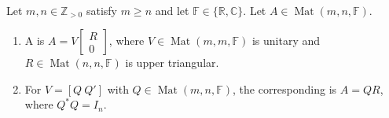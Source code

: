 \begin{definition} \label{def:wide-and-narrow-qr-factorization} \\
Let $m,n\in\mathbb{Z}_{>0}$ satisfy $m\geq n$ and let $\mathbb{F}\in\{\mathbb{R},\mathbb{C}\}$. Let $A\in\operatorname{Mat}(m,n,\mathbb{F})$.
\begin{enumerate}[label=(\roman*)]
\setlength{\itemsep}{0pt}
\item A  is $A=V\left[\begin{smallmatrix}R\\0\end{smallmatrix}\right]$, where $V\in\operatorname{Mat}(m,m,\mathbb{F})$ is unitary and $R\in\operatorname{Mat}(n,n,\mathbb{F})$ is upper triangular.
\item For $V=[Q\ Q']$ with $Q\in\operatorname{Mat}(m,n,\mathbb{F})$, the corresponding  is $A=QR$, where $Q^*Q=I_n$.
\end{enumerate}
\end{definition}

